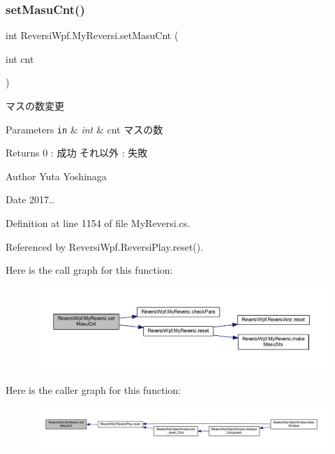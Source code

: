 \subsubsection{\texorpdfstring{set\+Masu\+Cnt()}{setMasuCnt()}}
{\footnotesize\ttfamily int Reversi\+Wpf.\+My\+Reversi.\+set\+Masu\+Cnt (\begin{DoxyParamCaption}\item[{int}]{cnt }\end{DoxyParamCaption})}



マスの数変更 


\begin{DoxyParams}[1]{Parameters}
\mbox{\tt in}  & {\em int} & cnt マスの数 \\
\hline
\end{DoxyParams}
\begin{DoxyReturn}{Returns}
0 \+: 成功 それ以外 \+: 失敗 
\end{DoxyReturn}
\begin{DoxyAuthor}{Author}
Yuta Yoshinaga 
\end{DoxyAuthor}
\begin{DoxyDate}{Date}
2017.. 
\end{DoxyDate}


Definition at line 1154 of file My\+Reversi.\+cs.



Referenced by Reversi\+Wpf.\+Reversi\+Play.\+reset().

Here is the call graph for this function\+:
\nopagebreak
\begin{figure}[H]
\begin{center}
\leavevmode
\includegraphics[width=350pt]{class_reversi_wpf_1_1_my_reversi_a1e25c6ee30dd15b6ae87e355bddd6af6_cgraph}
\end{center}
\end{figure}
Here is the caller graph for this function\+:
\nopagebreak
\begin{figure}[H]
\begin{center}
\leavevmode
\includegraphics[width=350pt]{class_reversi_wpf_1_1_my_reversi_a1e25c6ee30dd15b6ae87e355bddd6af6_icgraph}
\end{center}
\end{figure}
\mbox{\label{class_reversi_wpf_1_1_my_reversi_a03c7e639718936243e30302680c63f99}} 
